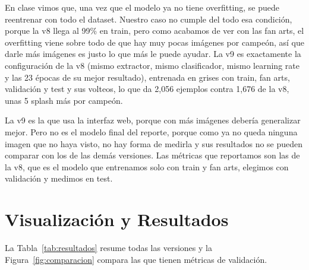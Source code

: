 \documentclass[10pt,twocolumn]{article}
\begin{document}
En clase vimos que, una vez que el modelo ya no tiene overfitting, se puede reentrenar con todo el dataset. Nuestro caso no cumple del todo esa condición, porque la v8 llega al 99\% en train, pero como acabamos de ver con las fan arts, el overfitting viene sobre todo de que hay muy pocas imágenes por campeón, así que darle más imágenes es justo lo que más le puede ayudar. La v9 es exactamente la configuración de la v8 (mismo extractor, mismo clasificador, mismo learning rate y las 23 épocas de su mejor resultado), entrenada en grises con train, fan arts, validación y test y sus volteos, lo que da 2,056 ejemplos contra 1,676 de la v8, unas 5 splash más por campeón.

La v9 es la que usa la interfaz web, porque con más imágenes debería generalizar mejor. Pero no es el modelo final del reporte, porque como ya no queda ninguna imagen que no haya visto, no hay forma de medirla y sus resultados no se pueden comparar con los de las demás versiones. Las métricas que reportamos son las de la v8, que es el modelo que entrenamos solo con train y fan arts, elegimos con validación y medimos en test.

\section{Visualización y Resultados}

La Tabla~\ref{tab:resultados} resume todas las versiones y la Figura~\ref{fig:comparacion} compara las que tienen métricas de validación.
\end{document}
